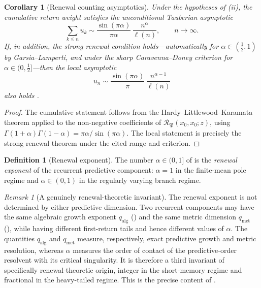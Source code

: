 \documentclass[11pt]{article}
\newtheorem{corollary}[theorem]{Corollary}
\theoremstyle{definition}
\newtheorem{definition}[theorem]{Definition}
\theoremstyle{remark}
\newtheorem{remark}[theorem]{Remark}
\newcommand{\Acc}{\mathcal{R}}
\newcommand{\Pp}{\mathfrak{P}}
\newcommand{\qalg}{q_{\mathrm{alg}}}
\newcommand{\qmet}{q_{\mathrm{met}}}
\begin{document}
\begin{corollary}[Renewal counting asymptotics]
\label{cor:renewal-counting}
Under the hypotheses of \textup{(ii)}, the
cumulative return weight satisfies the unconditional Tauberian asymptotic
\[
  \sum_{k\leq n}u_k
  \sim \frac{\sin(\pi\alpha)}{\pi\alpha}\,
  \frac{n^\alpha}{\ell(n)},
  \qquad n\to\infty.
\]
If, in addition, the strong renewal condition holds---automatically for
$\alpha\in(\tfrac12,1)$ by Garsia--Lamperti, and under the sharp
Caravenna--Doney criterion for $\alpha\in(0,\tfrac12]$---then the local
asymptotic
\[
  u_n\sim \frac{\sin(\pi\alpha)}{\pi}\,
  \frac{n^{\alpha-1}}{\ell(n)}
\]
also holds
\cite{garsialamperti1962,erickson1970,doney1997,caravennadoney2019}.
\end{corollary}

\begin{proof}
The cumulative statement follows from the Hardy--Littlewood--Karamata theorem
applied to the non-negative coefficients of
$\Acc_{\Pp}(x_0,x_0;z)$, using
$\Gamma(1+\alpha)\Gamma(1-\alpha)=\pi\alpha/\sin(\pi\alpha)$.
The local statement is precisely the strong renewal theorem under the cited
range and criterion.
\end{proof}

\begin{definition}[Renewal exponent]
\label{def:renewal-exponent}
The number $\alpha\in(0,1]$ of  is the
\emph{renewal exponent} of the recurrent predictive component: $\alpha=1$ in
the finite-mean pole regime and $\alpha\in(0,1)$ in the regularly varying
branch regime.
\end{definition}

\begin{remark}[A genuinely renewal-theoretic invariant]
\label{rem:renewal-invariant}
The renewal exponent is not determined by either predictive dimension.  Two
recurrent components may have the same algebraic growth exponent $\qalg$
\textup{(}\textup{)} and the same metric dimension $\qmet$
\textup{(}\textup{)}, while having different first-return tails
and hence different values of $\alpha$.  The quantities $\qalg$ and $\qmet$
measure, respectively, exact predictive growth and metric resolution, whereas
$\alpha$ measures the order of contact of the predictive-order resolvent with
its critical singularity.  It is therefore a third invariant of specifically
renewal-theoretic origin, integer in the short-memory regime and fractional in
the heavy-tailed regime.  This is the precise content of
.
\end{remark}
\end{document}
